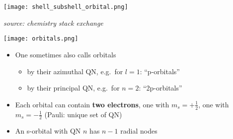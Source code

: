 
\begin{center}
    \texttt{[image: shell\_subshell\_orbital.png]}
\end{center}
\textit{source: chemistry stack exchange}
\begin{center}
    \texttt{[image: orbitals.png]}
\end{center}


\begin{itemize}
    \item One sometimes also calls orbitals
    \begin{itemize}
        \item by their azimuthal QN, e.g.\ for $l=1$: ``p-orbitals''
        \item by their principal QN, e.g.\ for $n=2$: ``2p-orbitals''
    \end{itemize}
    \item Each orbital can contain \textbf{two electrons}, one with $m_s=+\frac{1}{2}$, one with $m_s=-\frac{1}{2}$ (Pauli: unique set of QN)
    \item An s-orbital with QN $n$ has $n-1$ radial nodes
\end{itemize}

